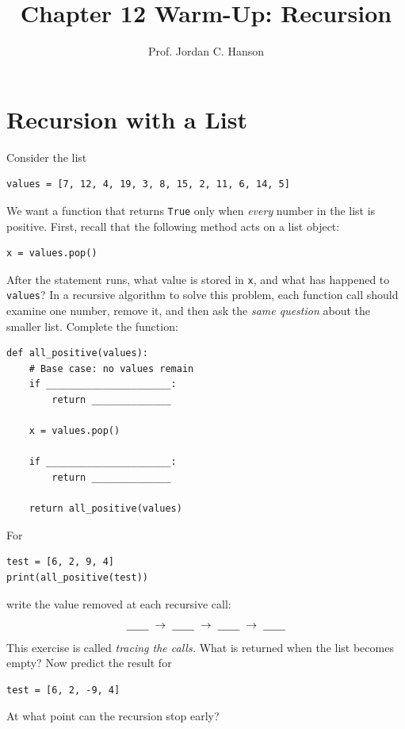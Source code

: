 \documentclass[11pt]{article}
\begin{document}
\twocolumn

\title{Chapter 12 Warm-Up: Recursion}
\author{Prof. Jordan C. Hanson}
\date{}

\maketitle

\section{Recursion with a List}
Consider the list \\
\begin{lstlisting}
values = [7, 12, 4, 19, 3, 8, 15, 2, 11, 6, 14, 5]
\end{lstlisting} \vspace{0.25cm}
We want a function that returns \texttt{True} only when \emph{every} number in the list is positive.  First, recall that the following method acts on a list object: \\
\begin{lstlisting}
x = values.pop()
\end{lstlisting}\vspace{0.25cm}
After the statement runs, what value is stored in \texttt{x}, and what has happened to \texttt{values}?  In a recursive algorithm to solve this problem, each function call should examine one number, remove it, and then ask the \emph{same question} about the smaller list. Complete the function: \\
\begin{lstlisting}
def all_positive(values):
    # Base case: no values remain
    if ______________________:
        return ______________

    x = values.pop()

    if ______________________:
        return ______________

    return all_positive(values)
\end{lstlisting}\vspace{0.25cm}

For \\
\begin{lstlisting}
test = [6, 2, 9, 4]
print(all_positive(test))
\end{lstlisting}\vspace{0.25cm}
write the value removed at each recursive call:
\[
\underline{\hspace{0.7cm}}\;\rightarrow\;
\underline{\hspace{0.7cm}}\;\rightarrow\;
\underline{\hspace{0.7cm}}\;\rightarrow\;
\underline{\hspace{0.7cm}}
\]
This exercise is called \textit{tracing the calls.}  What is returned when the list becomes empty? Now predict the result for \\
\begin{lstlisting}
test = [6, 2, -9, 4]
\end{lstlisting}\vspace{0.25cm}
At what point can the recursion stop early?
\end{document}
